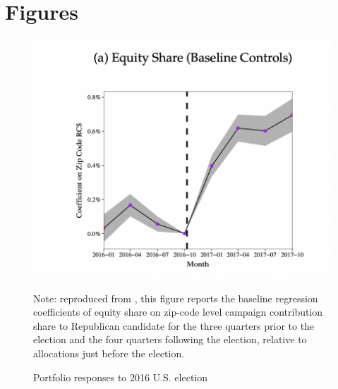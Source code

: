 \section*{Figures}

\begin{figure}[!ht] \centering  %
	\caption{Portfolio responses to 2016 U.S. election}
	\label{fig:parker}
	\centerline{\includegraphics[width=\textwidth]{./figures/parker.png}}
	\begin{flushleft}
		{\footnotesize Note: reproduced from \cite{meeuwis2018belief}, this figure reports the baseline regression coefficients of equity share on zip-code level  campaign contribution share to Republican candidate for the three quarters prior to the election and the four quarters following the election, relative to allocations just before the election.}
	\end{flushleft}
\end{figure}


